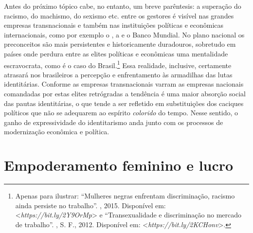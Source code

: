 Antes do próximo tópico cabe, no entanto, um breve parêntesis: a
superação do racismo, do machismo, do sexismo etc. entre os gestores é
visível nas grandes empresas transnacionais e também nas instituições
políticas e econômicas internacionais, como por exemplo o , a  e o
Banco Mundial. No plano nacional os preconceitos são mais persistentes e
historicamente duradouros, sobretudo em países onde perdura entre as
elites políticas e econômicas uma mentalidade escravocrata, como é o
caso do Brasil.\footnote{Apenas para ilustrar: ``Mulheres negras
  enfrentam discriminação, racismo ainda persiste no trabalho''.
  , 2015. Disponível em:
  \textless{}\emph{https://bit.ly/2Y9OrMp}\textgreater{}
  e ``Transexualidade e discriminação no mercado de trabalho''. , S. F., 2012. Disponível em:
  \textless{}\emph{https://bit.ly/2KCHonv}\textgreater{}.}
Essa realidade, inclusive, certamente atrasará nos brasileiros a
percepção e enfrentamento às armadilhas das lutas identitárias. Conforme
as empresas transnacionais varram as empresas nacionais comandadas por
estas elites retrógradas a tendência é uma maior absorção social das
pautas identitárias, o que tende a ser refletido em substituições dos
caciques políticos que não se adequarem ao espírito \emph{colorido} do
tempo. Nesse sentido, o ganho de expressividade do identitarismo anda
junto com os processos de modernização econômica e política.

\chapter{Empoderamento feminino e lucro}

